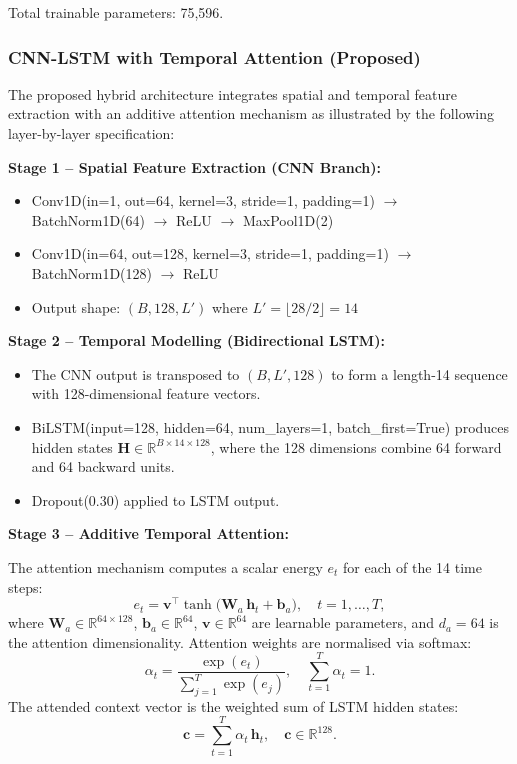 \documentclass[conference]{IEEEtran}
\begin{document}
Total trainable parameters: 75,596.

\subsubsection{CNN-LSTM with Temporal Attention (Proposed)}

The proposed hybrid architecture integrates spatial and temporal feature
extraction with an additive attention mechanism as illustrated by the following
layer-by-layer specification:

\textbf{Stage 1 -- Spatial Feature Extraction (CNN Branch):}
\begin{itemize}
  \item Conv1D(in=1, out=64, kernel=3, stride=1, padding=1) $\to$ BatchNorm1D(64) $\to$ ReLU $\to$ MaxPool1D(2)
  \item Conv1D(in=64, out=128, kernel=3, stride=1, padding=1) $\to$ BatchNorm1D(128) $\to$ ReLU
  \item Output shape: $(B, 128, L')$ where $L' = \lfloor 28/2 \rfloor = 14$
\end{itemize}

\textbf{Stage 2 -- Temporal Modelling (Bidirectional LSTM):}
\begin{itemize}
  \item The CNN output is transposed to $(B, L', 128)$ to form a length-14
        sequence with 128-dimensional feature vectors.
  \item BiLSTM(input=128, hidden=64, num\_layers=1, batch\_first=True)
        produces hidden states $\mathbf{H} \in \mathbb{R}^{B \times 14 \times 128}$,
        where the 128 dimensions combine 64 forward and 64 backward units.
  \item Dropout(0.30) applied to LSTM output.
\end{itemize}

\textbf{Stage 3 -- Additive Temporal Attention:}

The attention mechanism \cite{bahdanau2015} computes a scalar energy $e_t$ for
each of the 14 time steps:
\begin{equation}
  e_t = \mathbf{v}^{\top} \tanh\!\bigl(\mathbf{W}_a\,\mathbf{h}_t + \mathbf{b}_a\bigr),
  \quad t = 1, \ldots, T,
  \label{eq:energy}
\end{equation}
where $\mathbf{W}_a \in \mathbb{R}^{64 \times 128}$, $\mathbf{b}_a \in \mathbb{R}^{64}$,
$\mathbf{v} \in \mathbb{R}^{64}$ are learnable parameters, and $d_a = 64$ is the
attention dimensionality. Attention weights are normalised via softmax:
\begin{equation}
  \alpha_t = \frac{\exp(e_t)}{\sum_{j=1}^{T} \exp(e_j)}, \quad \sum_{t=1}^T \alpha_t = 1.
  \label{eq:softmax}
\end{equation}
The attended context vector is the weighted sum of LSTM hidden states:
\begin{equation}
  \mathbf{c} = \sum_{t=1}^{T} \alpha_t\,\mathbf{h}_t, \quad \mathbf{c} \in \mathbb{R}^{128}.
  \label{eq:context}
\end{equation}
\end{document}
